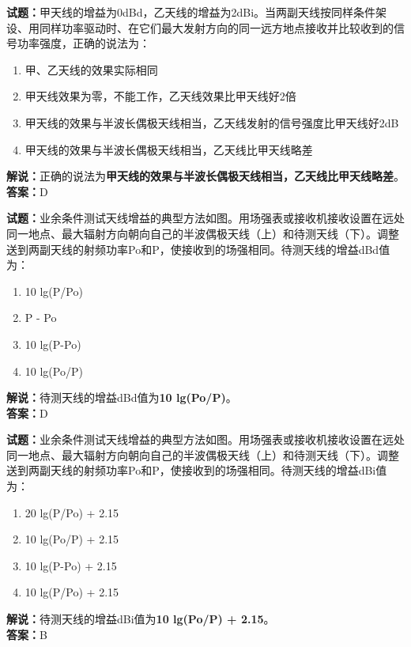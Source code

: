\documentclass{ctexbook}
\begin{document}
\bigskip


\noindent\textbf{试题：}甲天线的增益为0dBd，乙天线的增益为2dBi。当两副天线按同样条件架设、用同样功率驱动时、在它们最大发射方向的同一远方地点接收并比较收到的信号功率强度，正确的说法为：
\begin{enumerate}[leftmargin=3em]
\item 甲、乙天线的效果实际相同
\item 甲天线效果为零，不能工作，乙天线效果比甲天线好2倍%
\item 甲天线的效果与半波长偶极天线相当，乙天线发射的信号强度比甲天线好2dB%
\item 甲天线的效果与半波长偶极天线相当，乙天线比甲天线略差%
\end{enumerate}
\noindent\textbf{解说：}正确的说法为\textbf{甲天线的效果与半波长偶极天线相当，乙天线比甲天线略差}。\\\noindent\textbf{答案：}D



\bigskip


\noindent\textbf{试题：}业余条件测试天线增益的典型方法如图。用场强表或接收机接收设置在远处同一地点、最大辐射方向朝向自己的半波偶极天线（上）和待测天线（下）。调整送到两副天线的射频功率Po和P，使接收到的场强相同。待测天线的增益dBd值为：
\begin{enumerate}[leftmargin=3em]
\item 10 lg(P/Po)
\item P - Po
\item 10 lg(P-Po)
\item 10 lg(Po/P)
\end{enumerate}
\noindent\textbf{解说：}待测天线的增益dBd值为\textbf{10 lg(Po/P)}。\\\noindent\textbf{答案：}D



\bigskip


\noindent\textbf{试题：}业余条件测试天线增益的典型方法如图。用场强表或接收机接收设置在远处同一地点、最大辐射方向朝向自己的半波偶极天线（上）和待测天线（下）。调整送到两副天线的射频功率Po和P，使接收到的场强相同。待测天线的增益dBi值为：
\begin{enumerate}[leftmargin=3em]
\item 20 lg(P/Po) + 2.15
\item 10 lg(Po/P) + 2.15
\item 10 lg(P-Po) + 2.15
\item 10 lg(P/Po) + 2.15
\end{enumerate}
\noindent\textbf{解说：}待测天线的增益dBi值为\textbf{10 lg(Po/P) + 2.15}。\\\noindent\textbf{答案：}B
\end{document}
